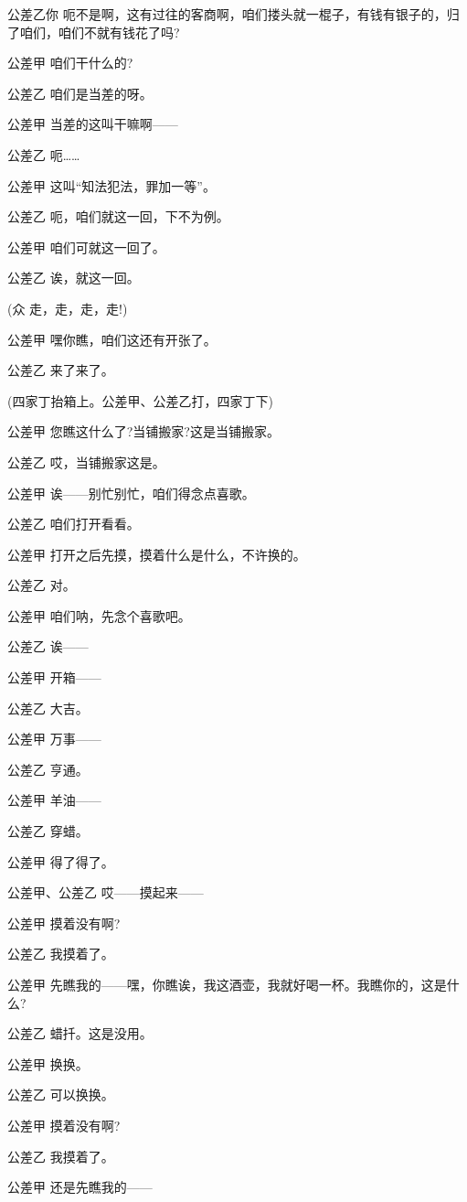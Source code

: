 公差乙你
呃不是啊，这有过往的客商啊，咱们搂头就一棍子，有钱有银子的，归了咱们，咱们不就有钱花了吗?

公差甲 咱们干什么的?

公差乙 咱们是当差的呀。

公差甲 当差的这叫干嘛啊------

公差乙 呃\ldots{}\ldots{}

公差甲 这叫``知法犯法，罪加一等''。

公差乙 呃，咱们就这一回，下不为例。

公差甲 咱们可就这一回了。

公差乙 诶，就这一回。

(众 走，走，走，走!)

公差甲 嘿你瞧，咱们这还有开张了。

公差乙 来了来了。

(四家丁抬箱上。公差甲、公差乙打，四家丁下)

公差甲 您瞧这什么了?当铺搬家?这是当铺搬家。

公差乙 哎，当铺搬家这是。

公差甲 诶------别忙别忙，咱们得念点喜歌。

公差乙 咱们打开看看。

公差甲 打开之后先摸，摸着什么是什么，不许换的。

公差乙 对。

公差甲 咱们呐，先念个喜歌吧。

公差乙 诶------

公差甲 开箱------

公差乙 大吉。

公差甲 万事------

公差乙 亨通。

公差甲 羊油------

公差乙 穿蜡。

公差甲 得了得了。

公差甲、公差乙 哎------摸起来------

公差甲 摸着没有啊?

公差乙 我摸着了。

公差甲
先瞧我的------嘿，你瞧诶，我这酒壶，我就好喝一杯。我瞧你的，这是什么?

公差乙 蜡扦。这是没用。

公差甲 换换。

公差乙 可以换换。

公差甲 摸着没有啊?

公差乙 我摸着了。

公差甲 还是先瞧我的------

